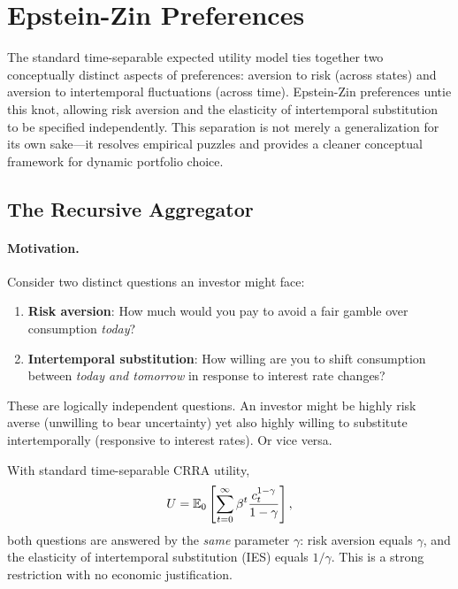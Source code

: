 
\section{Epstein-Zin Preferences}
\label{sec:epstein-zin}

The standard time-separable expected utility model ties together two conceptually distinct aspects of preferences: aversion to risk (across states) and aversion to intertemporal fluctuations (across time). Epstein-Zin preferences untie this knot, allowing risk aversion and the elasticity of intertemporal substitution to be specified independently. This separation is not merely a generalization for its own sake---it resolves empirical puzzles and provides a cleaner conceptual framework for dynamic portfolio choice.

\subsection{The Recursive Aggregator}
\label{subsec:ez-aggregator}

\paragraph{Motivation.}

Consider two distinct questions an investor might face:
\begin{enumerate}[nosep]
    \item \textbf{Risk aversion}: How much would you pay to avoid a fair gamble over consumption \emph{today}?
    \item \textbf{Intertemporal substitution}: How willing are you to shift consumption between \emph{today and tomorrow} in response to interest rate changes?
\end{enumerate}

These are logically independent questions. An investor might be highly risk averse (unwilling to bear uncertainty) yet also highly willing to substitute intertemporally (responsive to interest rates). Or vice versa.

With standard time-separable CRRA utility,
\begin{equation}
U = \mathbb{E}_0 \left[ \sum_{t=0}^{\infty} \beta^t \frac{c_t^{1-\gamma}}{1-\gamma} \right],
\label{eq:time-separable}
\end{equation}
both questions are answered by the \emph{same} parameter $\gamma$: risk aversion equals $\gamma$, and the elasticity of intertemporal substitution (IES) equals $1/\gamma$. This is a strong restriction with no economic justification.

